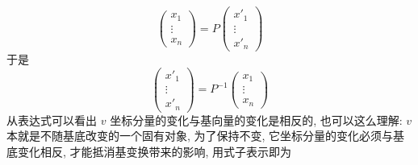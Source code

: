 \documentclass{book}
\begin{document}
        \begin{equation*}
            \begin{pmatrix}
                x_1 \\ \vdots \\ x_n
            \end{pmatrix} = 
            P
            \begin{pmatrix}
                {x'}_1 \\ \vdots \\ {x'}_n
            \end{pmatrix}
        \end{equation*}
        于是
        \begin{equation*}
            \begin{pmatrix}
                {x'}_1 \\ \vdots \\ {x'}_n
            \end{pmatrix} = 
            P^{-1}
            \begin{pmatrix}
                x_1 \\ \vdots \\ x_n
            \end{pmatrix}
        \end{equation*}
        从表达式可以看出 $v$ 坐标分量的变化与基向量的变化是相反的, 也可以这么理解: $v$ 本就是不随基底改变的一个固有对象, 为了保持不变, 
        它坐标分量的变化必须与基底变化相反, 才能抵消基变换带来的影响, 用式子表示即为
\end{document}

